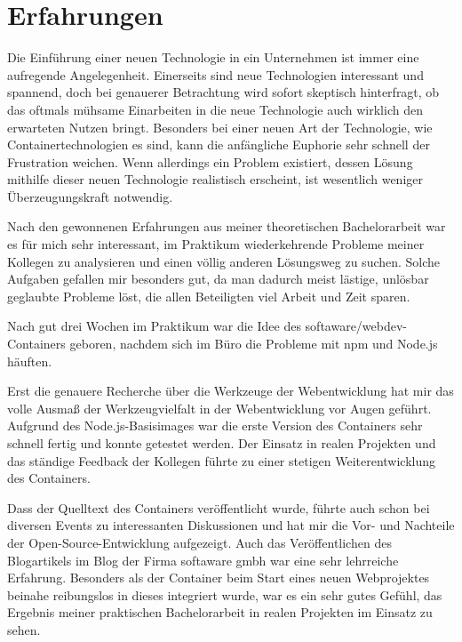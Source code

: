 \chapter{Erfahrungen}
\label{cha:experience}
Die Einführung einer neuen Technologie in ein Unternehmen ist immer eine aufregende Angelegenheit.
Einerseits sind neue Technologien interessant und spannend, doch bei genauerer Betrachtung wird sofort skeptisch hinterfragt, ob das oftmals mühsame Einarbeiten in die neue Technologie auch wirklich den erwarteten Nutzen bringt.
Besonders bei einer neuen Art der Technologie, wie Containertechnologien es sind, kann die anfängliche Euphorie sehr schnell der Frustration weichen.
Wenn allerdings ein Problem existiert, dessen Lösung mithilfe dieser neuen Technologie realistisch erscheint, ist wesentlich weniger Überzeugungskraft notwendig.

Nach den gewonnenen Erfahrungen aus meiner theoretischen Bachelorarbeit war es für mich sehr interessant, im Praktikum wiederkehrende Probleme meiner Kollegen zu analysieren und einen völlig anderen Lösungsweg zu suchen.
Solche Aufgaben gefallen mir besonders gut, da man dadurch meist lästige, unlösbar geglaubte Probleme löst, die allen Beteiligten viel Arbeit und Zeit sparen.

Nach gut drei Wochen im Praktikum war die Idee des softaware/webdev-Containers geboren, nachdem sich im Büro die Probleme mit npm und Node.js häuften.

Erst die genauere Recherche über die Werkzeuge der Webentwicklung hat mir das volle Ausmaß der Werkzeugvielfalt in der Webentwicklung vor Augen geführt.
Aufgrund des Node.js-Basisimages war die erste Version des Containers sehr schnell fertig und konnte getestet werden.
Der Einsatz in realen Projekten und das ständige Feedback der Kollegen führte zu einer stetigen Weiterentwicklung des Containers.

Dass der Quelltext des Containers veröffentlicht wurde, führte auch schon bei diversen Events zu interessanten Diskussionen und hat mir die Vor- und Nachteile der Open-Source-Entwicklung aufgezeigt.
Auch das Veröffentlichen des Blogartikels \autocite{Mayr.docker-webdev:online} im Blog der Firma softaware gmbh war eine sehr lehrreiche Erfahrung.
Besonders als der Container beim Start eines neuen Webprojektes beinahe reibungslos in dieses integriert wurde, war es ein sehr gutes Gefühl, das Ergebnis meiner praktischen Bachelorarbeit in realen Projekten im Einsatz zu sehen.
